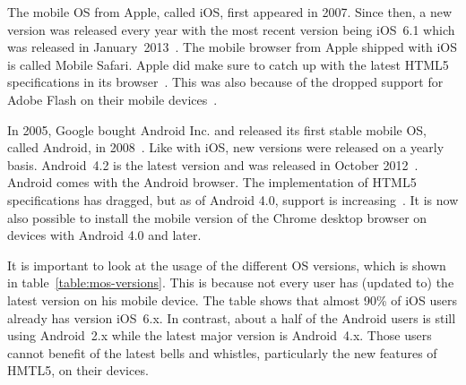 \documentclass[a4paper]{artikel3}
\begin{document}
The mobile OS from Apple, called iOS, first appeared in 2007.
Since then, a new version was released every year with the most recent version being iOS~6.1 which was released in January~2013~\cite{Deitel2012,PhilDutson2012,Apple2013}.
The mobile browser from Apple shipped with iOS is called Mobile Safari.
Apple did make sure to catch up with the latest HTML5 specifications in its browser~\cite{Hales2012}.
This was also because of the dropped support for Adobe Flash on their mobile devices~\cite{Jobs2010}.

In 2005, Google bought Android Inc. and released its first stable mobile OS, called Android, in 2008~\cite{Satyesh2012}.
Like with iOS, new versions were released on a yearly basis.
Android~4.2 is the latest version and was released in October 2012~\cite{Sawers2012}.
Android comes with the Android browser.
The implementation of HTML5 specifications has dragged, but as of Android 4.0, support is increasing~\cite{Hales2012}.
It is now also possible to install the mobile version of the Chrome desktop browser on devices with Android 4.0 and later.

It is important to look at the usage of the different OS versions, which is shown in table~\ref{table:mos-versions}.
This is because not every user has (updated to) the latest version on his mobile device.
The table shows that almost 90\% of iOS users already has version iOS~6.x.
In contrast, about a half of the Android users is still using Android~2.x while the latest major version is Android~4.x. 
Those users cannot benefit of the latest bells and whistles, particularly the new features of HMTL5, on their devices.

\begin{table}[t]
\centering
{}
\quad
{}
\caption{Usage of iOS versions on May 8, 2013 and Android versions on May 1, 2013 \protect\cite{Smith2013,Android2013}.}
\label{table:mos-versions}
\end{table}
\end{document}
